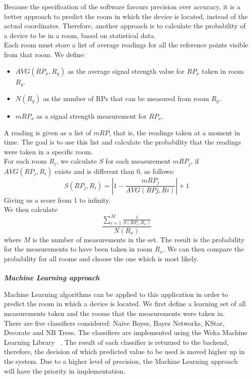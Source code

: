 Because the specification of the software favours precision over accuracy, it is a better approach to predict the room in which the device is located, instead of the actual coordinates. Therefore, another approach is to calculate the probability of a device to be in a room, based on statistical data.\\
Each room must store a list of average readings for all the reference points visible from that room. 
We define:\\
\begin{itemize}
\item $AVG(RP_x, R_y)$ as the average signal strength value for $RP_x$ taken in room $R_y$.
\item $N(R_y)$ as the number of RPs that can be measured from room $R_y$.
\item $mRP_x$ as a signal strength measurement for $RP_x$.
\end{itemize} 

A reading is given as a list of $mRP$, that is, the readings taken at a moment in time. The goal is to use this list and calculate the probability that the readings were taken in a specific room.\\
For each room $R_i$, we calculate $S$ for each measurement $mRP_j$, if $AVG(RP_j, R_i)$ exists and is different than 0, as follows:
$$S(RP_j, R_i) = | 1 - \frac{mRP_j}{AVG(RPj, Ri)}|+1$$
Giving us a score from 1 to infinity.\\
We then calculate 
$$\frac{\displaystyle\sum_{i=1}^{M} \frac{1}{S(RP_i, R_x)}}{N(R_x)}$$
where $M$ is the number of measurements in the set.
The result is the probability for the measurements to have been taken in room $R_x$.
We can then compare the probability for all rooms and choose the one which is most likely.\\
\\
\textit{\textbf{Machine Learning approach}}

Machine Learning algorithms can be applied to this application in order to predict the room in which a device is located. We first define a learning set of all measurements taken and the rooms that the measurements were taken in.\\
There are five classifiers considered:
Naive Bayes, Bayes Networks, KStar, Decorate and NB Trees. The classifiers are implemented using the Weka Machine Learning Library ~\cite{Weka}. The result of each classifier is returned to the backend, therefore, the decision of which predicted value to be used is moved higher up in the system.
Due to a higher level of precision, the Machine Learning approach will have the priority in implementation.

